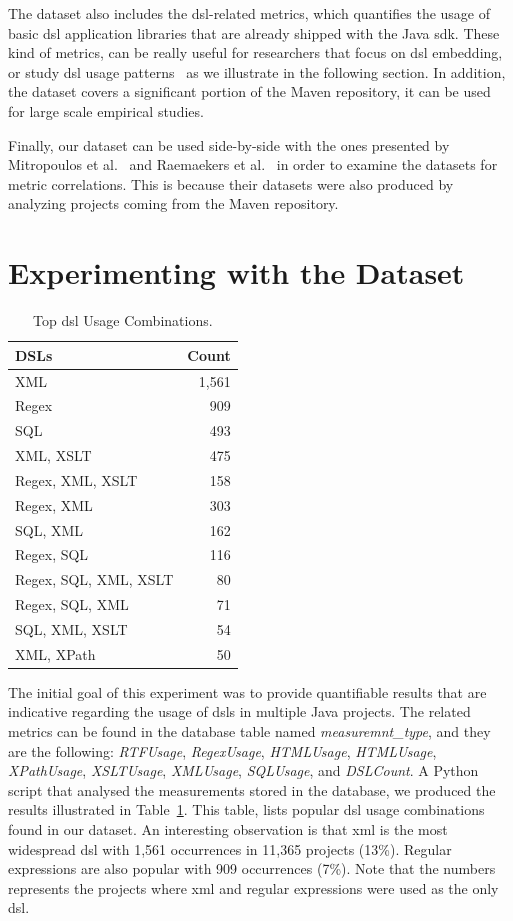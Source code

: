 \documentclass[conference]{IEEEtran}
\begin{document}
The dataset also includes the {\sc dsl}-related metrics, which quantifies the usage of basic {\sc dsl} application libraries that are already shipped with the Java {\sc sdk}. These kind of metrics, can be really useful for researchers that focus on {\sc dsl} embedding, or study {\sc dsl} usage patterns~\cite{KARA14} as we illustrate in the following section. In addition, the dataset covers a significant portion of the Maven repository, it can be used for large scale empirical studies.

Finally, our dataset can be used side-by-side with the ones presented by Mitropoulos et al.~\cite{HP04} and Raemaekers et al.~\cite{RDV13} in order to examine the datasets for metric correlations. This is because their datasets were also produced by analyzing projects coming from the Maven repository.

\section{Experimenting with the Dataset}
\label{sec:dsl}

\begin{table}[!t]
\caption{Top {\sc dsl} Usage Combinations.}
\label{tbl:dsl-top-usage}
\centering
\begin{tabular}{|l||r|}
 \hline
\textbf{DSLs} & \textbf{Count}\\
\hline
XML & 1,561\\
\hline
Regex & 909\\
\hline
SQL & 493\\
\hline
XML, XSLT & 475\\
\hline
Regex, XML, XSLT & 158\\
\hline
Regex, XML & 303\\
\hline
SQL, XML & 162\\
\hline
Regex, SQL & 116\\
\hline
Regex, SQL, XML, XSLT & 80\\
\hline
Regex, SQL, XML & 71\\
\hline
SQL, XML, XSLT & 54\\
\hline
XML, XPath & 50\\
\hline
\end{tabular}
\end{table}

The initial goal of this experiment was to provide quantifiable results that are indicative regarding the usage of {\sc dsl}s in multiple Java projects. The related metrics can be found in the database table named \textit{measuremnt\_type}, and they are the following: \textit{RTFUsage}, \textit{RegexUsage}, \textit{HTMLUsage}, \textit{HTMLUsage}, \textit{XPathUsage}, \textit{XSLTUsage}, \textit{XMLUsage}, \textit{SQLUsage}, and \textit{DSLCount}. A Python script that analysed the measurements stored in the database, we produced the results illustrated in Table~\ref{tbl:dsl-top-usage}. This table, lists popular {\sc dsl} usage combinations found in our dataset. An interesting observation is that {\sc xml} is the most widespread {\sc dsl} with 1,561 occurrences in 11,365 projects (13\%). Regular expressions are also popular with 909 occurrences (7\%). Note that the numbers represents the projects where {\sc xml} and regular expressions were used as the only {\sc dsl}.
\end{document}
